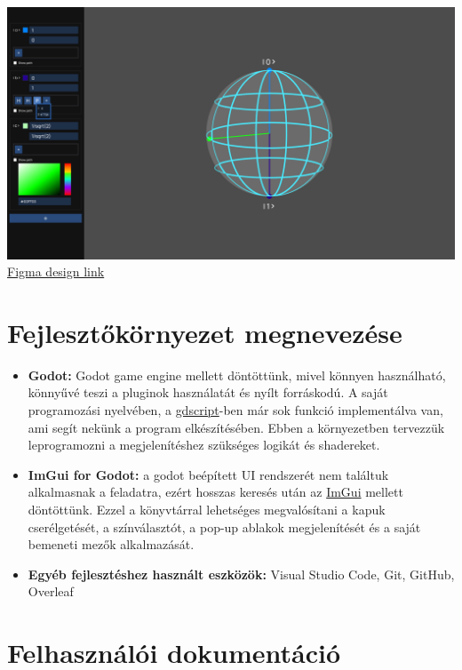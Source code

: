 \documentclass[fontsize=12pt,a4paper]{article}
\begin{document}
\includegraphics[width=1.0\textwidth]{Bloch-sphere.png}
\href{https://www.figma.com/design/X1JXQDatg8IsLa6VYQFRTJ/Bloch-sphere}{Figma design link}

\newpage
\section{Fejlesztőkörnyezet megnevezése}

\begin{itemize}
    \item \textbf{Godot:}  Godot game engine mellett döntöttünk, mivel könnyen használható, könnyűvé teszi a pluginok használatát és nyílt forráskodú. A saját programozási nyelvében, a \href{https://docs.godotengine.org/en/stable/tutorials/scripting/gdscript/gdscript_basics.html}{gdscript}-ben már sok funkció implementálva van, ami segít nekünk a program elkészítésében. Ebben a környezetben tervezzük leprogramozni a megjelenítéshez szükséges logikát és shadereket.
    \item \textbf{ImGui for Godot:} a godot beépített UI rendszerét nem találtuk alkalmasnak a feladatra, ezért hosszas keresés után az \href{https://godotengine.org/asset-library/asset/2985}{ImGui} mellett döntöttünk. Ezzel a könyvtárral lehetséges megvalósítani a kapuk cserélgetését, a színválasztót, a pop-up ablakok megjelenítését és a saját bemeneti mezők alkalmazását.
    \item \textbf{Egyéb fejlesztéshez használt eszközök:} Visual Studio Code, Git, GitHub, Overleaf
\end{itemize}

\newpage
\section{Felhasználói dokumentáció}
\end{document}
